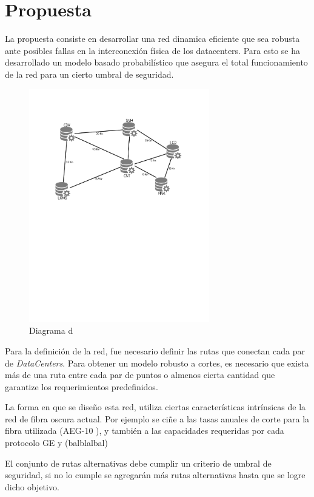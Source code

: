 \section{Propuesta}\label{sec:propuesta}

La propuesta consiste en desarrollar una red dinamica eficiente que sea robusta ante posibles fallas en la interconexión física de los datacenters. Para esto se ha desarrollado un modelo basado probabilístico que asegura el total funcionamiento de la red para un cierto umbral de seguridad.

\begin{figure}[h]
\centering
\includegraphics[width=0.7\textwidth]{Imagenes/datacenters.pdf}
\caption{Diagrama d}
\end{figure}

Para la definición de la red, fue necesario definir las rutas que conectan cada par de \textit{DataCenters}.
Para obtener un modelo robusto a cortes, es necesario que exista más de una ruta entre cada par de puntos o almenos cierta cantidad que garantize los requerimientos predefinidos. 

La forma en que se diseño esta red, utiliza ciertas características intrínsicas de la red de fibra oscura actual. Por ejemplo se ciñe a las tasas anuales de corte para la fibra utilizada (AEG-10 ), y también a las capacidades requeridas por cada protocolo GE y (balblalbal) 


El conjunto de rutas alternativas debe cumplir un criterio de umbral de seguridad, si no lo cumple se agregarán más rutas alternativas hasta que se logre dicho objetivo. 